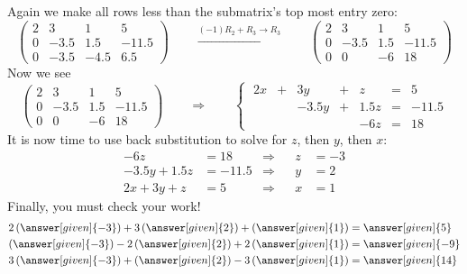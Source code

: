 \documentclass{ximera}
\begin{document}
\begin{example}
\begin{explanation}
\begin{center}
\end{center}
Again we make all rows less than the submatrix's top most entry zero:
\[
  \begin{pmatrix}
    2 & 3 & 1 & 5 \\
    0 & -3.5 & 1.5 &-11.5 \\
    0 & -3.5 & -4.5 & 6.5
  \end{pmatrix}
  \qquad\xrightarrow{(-1) R_2+R_3\to R_3}\qquad
  \begin{pmatrix}
    2 & 3 & 1 & 5 \\
    0 & -3.5 & 1.5 &-11.5 \\
    0 & 0    & -6 & 18
  \end{pmatrix}
\]
Now we see
\[
  \left(
    \begin{array}{rrr|r}
      2 & 3 & 1 & 5 \\
      0 & -3.5 & 1.5 &-11.5 \\
      0 & 0    & -6 & 18
    \end{array}
  \right)
  \qquad\Longrightarrow\qquad
  \left\{\;
    \begin{array}{rcrcrcr}
      2x  &+ & 3y &+& z &=& 5 \\
          &  &-3.5y&+&1.5z&=&-11.5\\
          & & & &-6z&=&18
    \end{array}
  \right.
\]
It is now time to use back substitution to solve for $z$, then $y$, then $x$:
\begin{align*}
  -6z &= 18   &\Rightarrow & & z &= -3\\
  -3.5y+1.5z &=-11.5 &\Rightarrow & & y &= 2\\
  2x  +  3y + z &= 5 &\Rightarrow & & x &= 1
\end{align*}
Finally, you must check your work!
  \begin{align*}
    2\left(\answer[given]{-3}\right)+ 3\left(\answer[given]{2}\right) + \left(\answer[given]{1}\right)  &= \answer[given]{5} \\
    \left(\answer[given]{-3}\right) -2\left(\answer[given]{2}\right)+ 2\left(\answer[given]{1}\right) &=\answer[given]{-9}\\
    3\left(\answer[given]{-3}\right) +\left(\answer[given]{2}\right)- 3\left(\answer[given]{1}\right) &=\answer[given]{14}
  \end{align*}
\end{explanation}
\end{example}
\end{document}
